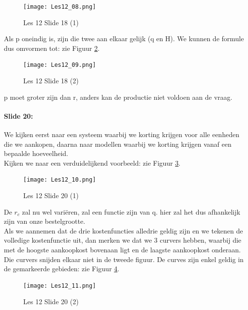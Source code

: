 \documentclass[10pt,a4paper]{report}
\begin{document}
\begin{figure}[h!]
\centering
\texttt{[image: Les12\_08.png]}
\caption{Les 12 Slide 18 (1)} 
\label{les12_08}
\end{figure}

Als p oneindig is, zijn die twee aan elkaar gelijk (q en H).
We kunnen de formule dus omvormen tot: zie Figuur \ref{les12_09}.\\

\begin{figure}[h!]
\centering
\texttt{[image: Les12\_09.png]}
\caption{Les 12 Slide 18 (2)} 
\label{les12_09}
\end{figure}

p moet groter zijn dan r, anders kan de productie niet voldoen aan de vraag.

\paragraph{Slide 20:} We kijken eerst naar een systeem waarbij we korting krijgen voor alle eenheden die we aankopen, daarna naar modellen waarbij we korting krijgen vanaf een bepaalde hoeveelheid.\\
Kijken we naar een verduidelijkend voorbeeld: zie Figuur \ref{les12_10}.

\begin{figure}[h!]
\centering
\texttt{[image: Les12\_10.png]}
\caption{Les 12 Slide 20 (1)} 
\label{les12_10}
\end{figure}

De $r_{c}$ zal nu wel vari\"eren, zal een functie zijn van q. hier zal het dus afhankelijk zijn van onze bestelgrootte.\\
Als we aannemen dat de drie kostenfuncties alledrie geldig zijn en we tekenen de volledige kostenfunctie uit, dan merken we dat we 3 curvers hebben, waarbij die met de hoogste aankoopkost bovenaan ligt en de laagste aankoopkost onderaan. Die curvers snijden elkaar niet in de tweede figuur. De curves zijn enkel geldig in de gemarkeerde gebieden: zie Figuur \ref{les12_11}.\\

\begin{figure}[h!]
\centering
\texttt{[image: Les12\_11.png]}
\caption{Les 12 Slide 20 (2)} 
\label{les12_11}
\end{figure}
\end{document}
